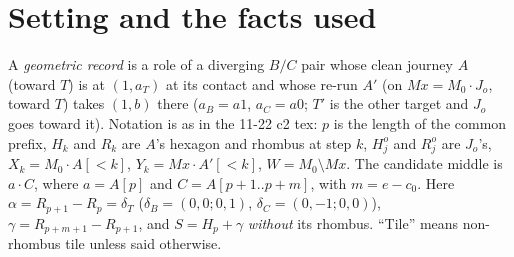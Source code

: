 \documentclass[11pt]{article}
\theoremstyle{definition}\newtheorem{definition}[theorem]{Definition}\newtheorem{remark}[theorem]{Remark}
\begin{document}
\section{Setting and the facts used}\label{sec:set}
A \emph{geometric record} is a role of a diverging $B/C$ pair whose clean journey $A$ (toward $T$) is at $(1,a_T)$ at its contact and whose re-run $A'$ (on $Mx=M_0\cdot J_o$, toward $T$) takes $(1,b)$ there ($a_B=a1$, $a_C=a0$; $T'$ is the other target and $J_o$ goes toward it). Notation is as in the 11-22 c2 tex: $p$ is the length of the common prefix, $H_k$ and $R_k$ are $A$'s hexagon and rhombus at step $k$, $H^o_j$ and $R^o_j$ are $J_o$'s, $X_k=M_0\cdot A[{<}k]$, $Y_k=Mx\cdot A'[{<}k]$, $W=M_0\setminus Mx$. The candidate middle is $a\cdot C$, where $a=A[p]$ and $C=A[p+1..p+m]$, with $m=e-c_0$. Here $\alpha=R_{p+1}-R_p=\delta_T$ ($\delta_B=(0,0;0,1)$, $\delta_C=(0,-1;0,0)$), $\gamma=R_{p+m+1}-R_{p+1}$, and $S=H_p+\gamma$ \emph{without} its rhombus. ``Tile'' means non-rhombus tile unless said otherwise.
\end{document}
